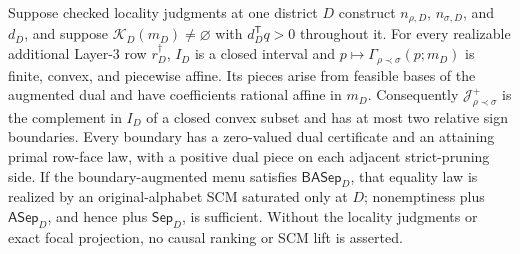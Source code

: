 Suppose checked locality judgments at one district \(D\) construct \(n_{\rho,D}\), \(n_{\sigma,D}\), and \(d_D\), and suppose \(\mathcal K_D(m_D)\ne\varnothing\) with \(d_D^{\mathsf T}q>0\) throughout it.  For every realizable additional Layer-3 row \(r_D^\dagger\), \(I_D\) is a closed interval and \(p\mapsto\Gamma_{\rho\prec\sigma}(p;m_D)\) is finite, convex, and piecewise affine.  Its pieces arise from feasible bases of the augmented dual and have coefficients rational affine in \(m_D\).  Consequently \(\mathcal J_{\rho\prec\sigma}^+\) is the complement in \(I_D\) of a closed convex subset and has at most two relative sign boundaries.  Every boundary has a zero-valued dual certificate and an attaining primal row-face law, with a positive dual piece on each adjacent strict-pruning side.  If the boundary-augmented menu satisfies \(\mathsf{BASep}_D\), that equality law is realized by an original-alphabet SCM saturated only at \(D\); nonemptiness plus \(\mathsf{ASep}_D\), and hence plus \(\mathsf{Sep}_D\), is sufficient.  Without the locality judgments or exact focal projection, no causal ranking or SCM lift is asserted.
